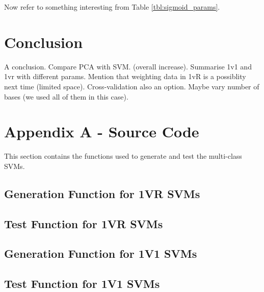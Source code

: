 \documentclass[a4paper, 10pt, conference]{ieeeconf}
\begin{document}
Now refer to something interesting from Table \ref{tbl:sigmoid_params}.

\section{Conclusion}
A conclusion. Compare PCA with SVM. (overall increase). Summarise 1v1 and 1vr with different params. Mention that weighting data in 1vR is a possiblity next time (limited space). Cross-validation also an option. Maybe vary number of bases (we used all of them in this case).




\clearpage
\onecolumn


\section*{Appendix A - Source Code}

This section contains the functions used to generate and test the multi-class SVMs.
\subsection*{Generation Function for 1VR SVMs}

\newpage
\subsection*{Test Function for 1VR SVMs}

\newpage
\subsection*{Generation Function for 1V1 SVMs}

\newpage
\subsection*{Test Function for 1V1 SVMs}

\end{document}
